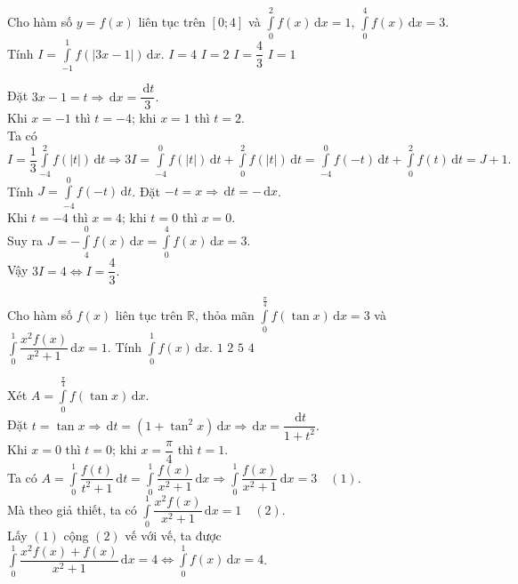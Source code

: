 \begin{ex}%
	Cho hàm số $y=f(x)$ liên tục trên $[0;4]$ và $\displaystyle\int\limits_0^2 f(x)\mathrm{\,d}x =1$, $\displaystyle\int\limits_0^4 f(x)\mathrm{\,d}x=3$. Tính  $I= \displaystyle\int\limits_{-1}^1 f\left(|3x-1|\right)\mathrm{\,d}x$.
		\choice
	{$I=4$}
	{$I=2$}
	{\True $I=\dfrac{4}{3}$}
	{$I=1$}
	\loigiai
	{Đặt $3x-1=t \Rightarrow \mathrm{\,d}x= \dfrac{\mathrm{\,d}t}{3}.$\\
		Khi $x=-1$ thì $t=-4$; khi $x=1$ thì $t=2$.\\
	Ta có $I= \dfrac{1}{3} \displaystyle\int\limits_{-4}^2 f\left(|t|\right)\mathrm{\,d}t \Rightarrow 3I= \displaystyle\int\limits_{-4}^0 f\left(|t|\right)\mathrm{\,d}t +\displaystyle\int\limits_{0}^2 f\left(|t|\right)\mathrm{\,d}t=\displaystyle\int\limits_{-4}^0 f\left(-t\right)\mathrm{\,d}t+\displaystyle\int\limits_{0}^2 f\left(t\right)\mathrm{\,d}t=J+1.$\\
	Tính $J= \displaystyle\int\limits_{-4}^0 f\left(-t\right)\mathrm{\,d}t$. Đặt $-t=x \Rightarrow \mathrm{\,d}t =-\mathrm{\,d}x$.\\
	Khi $t=-4$ thì $x=4$; khi $t=0$ thì $x=0$.\\
	Suy ra $J=-\displaystyle\int\limits_{4}^0 f\left(x\right)\mathrm{\,d}x = \displaystyle\int\limits_{0}^4 f\left(x\right)\mathrm{\,d}x=3.$\\
	Vậy $3I=4 \Leftrightarrow I=\dfrac{4}{3}.$
		
	}
\end{ex}

\begin{ex}%
	Cho hàm số $f(x)$ liên tục trên $\mathbb{R}$, thỏa mãn  $\displaystyle\int\limits_0^{\frac{\pi}{4}} f(\tan x)\mathrm{\,d}x=3$ và $\displaystyle\int\limits_0^1 \dfrac{x^2 f(x)}{x^2+1}\mathrm{\,d}x=1$. Tính $\displaystyle\int\limits_0^1 f(x)\mathrm{\,d}x$.
		\choice
	{$1$}
	{$2$}
	{$5$}
	{\True $4$}
	\loigiai
	{ Xét $A=\displaystyle\int\limits_0^{\frac{\pi}{4}} f(\tan x)\mathrm{\,d}x$.\\
	Đặt $t=\tan x \Rightarrow \mathrm{\,d}t=\left(1+\tan^2x\right)\mathrm{\,d}x \Rightarrow \mathrm{\,d}x =\dfrac{\mathrm{\,d}t}{1+t^2}.$\\
	Khi $x=0$ thì $t=0$; khi $x= \dfrac{\pi}{4}$ thì $t=1$.\\
	Ta có $A= \displaystyle\int\limits_0^1 \dfrac{f(t)}{t^2+1}\mathrm{\,d}t = \displaystyle\int\limits_0^1 \dfrac{f(x)}{x^2+1}\mathrm{\,d}x \Rightarrow \displaystyle\int\limits_0^1 \dfrac{f(x)}{x^2+1}\mathrm{\,d}x =3\quad (1).$\\
	Mà theo giả thiết, ta có $\displaystyle\int\limits_0^1 \dfrac{x^2 f(x)}{x^2+1}\mathrm{\,d}x=1 \quad (2).$\\
	Lấy $(1)$ cộng $(2)$ vế với vế, ta được $\displaystyle\int\limits_0^1 \dfrac{x^2 f(x)+f(x)}{x^2+1}\mathrm{\,d}x=4 \Leftrightarrow \displaystyle\int\limits_0^1 f(x)\mathrm{\,d}x=4$.
		
		
	}   
\end{ex}

